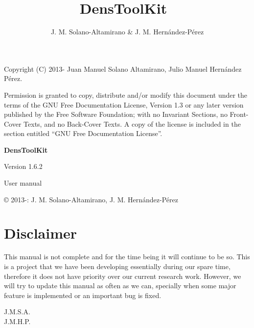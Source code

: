 \documentclass[12pt]{book}
\title{\textbf{Dens\-Tool\-Kit~\dtkversion}}
\author{J. M. Solano-Altamirano \& J. M. Hern\'andez-P\'erez}
\newcommand{\dtkversion}{1.6.2}
\begin{document}
\frontmatter
\maketitle

\newpage
\thispagestyle{empty}
\phantom{as}

\vspace{5cm}
Copyright (C) 2013-\the\year{}  Juan Manuel Solano Altamirano, Julio Manuel Hern\'andez P\'erez.

    Permission is granted to copy, distribute and/or modify this document
    under the terms of the GNU Free Documentation License, Version 1.3
    or any later version published by the Free Software Foundation;
    with no Invariant Sections, no Front-Cover Texts, and no Back-Cover Texts.
    A copy of the license is included in the section entitled ``GNU
    Free Documentation License''.
\newpage
\thispagestyle{empty}
\phantom{asf}
\vspace{5cm}
\begin{center}

{\HUGE\bf Dens\-Tool\-Kit}

\vspace{1cm}

{\Huge Version \dtkversion}

\vspace{1cm}

{\Huge User manual}

\end{center}

\vspace{8cm}
\copyright{} 2013-\the\year{}: J. M. Solano-Altamirano, J. M. Hern\'andez-P\'erez

\newpage\thispagestyle{empty}
\phantom{asd}

\vspace{50mm}

\section*{Disclaimer}

This manual is not complete and for the time being it will continue to be so. This is a project that we have been developing essentially during our spare time, therefore it does not have priority over our current research work. However, we will try to update this manual as often as we can, specially when some major feature is implemented or an important bug is fixed.

\begin{flushright} J.M.S.A. \\ J.M.H.P.\end{flushright}
\end{document}
